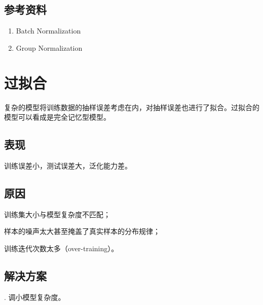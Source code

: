 \documentclass[letterpaper,10pt,english]{sphinxmanual}
\begin{document}
\subsection{参考资料}
\label{\detokenize{deepLearning/03_batchnorm:id4}}\begin{enumerate}
\item {} 
Batch Normalization

\end{enumerate}
\begin{quote}

\end{quote}
\begin{enumerate}
\setcounter{enumi}{1}
\item {} 
Group Normalization

\end{enumerate}
\begin{quote}

\end{quote}


\section{过拟合}
\label{\detokenize{deepLearning/04_overfit::doc}}\label{\detokenize{deepLearning/04_overfit:id1}}
复杂的模型将训练数据的抽样误差考虑在内，对抽样误差也进行了拟合。过拟合的模型可以看成是完全记忆型模型。


\subsection{表现}
\label{\detokenize{deepLearning/04_overfit:id2}}
训练误差小，测试误差大，泛化能力差。


\subsection{原因}
\label{\detokenize{deepLearning/04_overfit:id3}}
训练集大小与模型复杂度不匹配；

样本的噪声太大甚至掩盖了真实样本的分布规律；

训练迭代次数太多（over-training）。


\subsection{解决方案}
\label{\detokenize{deepLearning/04_overfit:id4}}
. 调小模型复杂度。
\end{document}
